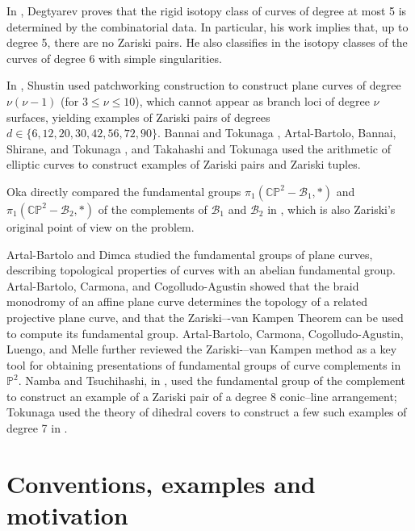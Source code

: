 \documentclass{svproc}
\begin{document}
In \cite{DEG_isotopy}, Degtyarev proves that the rigid isotopy class of curves of degree at most 5
is determined by the combinatorial data. In particular, his work implies that, up to
degree 5, there are no Zariski pairs. He also classifies in \cite{DEG} the isotopy classes of the
curves of degree 6 with simple singularities.

In \cite[Appendix A]{shustin_appendix}, Shustin used patchworking construction to construct plane curves of degree $ \nu (\nu-1) $ (for $ 3\le \nu \le 10 $), which cannot appear as branch loci of degree $ \nu $ surfaces, yielding examples of Zariski pairs of degrees $ d\in \{ 6, 12, 20, 30, 42, 56, 72, 90 \} $. 
Bannai and Tokunaga \cite{bannai_tokunaga2019zariski}, Artal-Bartolo, Bannai, Shirane, and Tokunaga \cite{bartolo_tokunaga2020torsion,bartolo_tokunaga2020torsion2}, and Takahashi and Tokunaga \cite{takahashi_tokunaga2020explicit} used the arithmetic of elliptic curves to construct examples of Zariski pairs and Zariski tuples. 

Oka directly compared the fundamental groups $ \pi_1(\mathbb{CP}^2 - \mathcal{B}_1, *)$ and $ \pi_1(\mathbb{CP}^2 - \mathcal{B}_2, *)$ of the complements of $\mathcal{B}_1$ and $\mathcal{B}_2$ in \cite{Oka1999FlexCA,Oka2002}, which is also Zariski's original point of view on the problem. 

Artal-Bartolo and Dimca \cite{Dimca} studied the fundamental groups of plane curves, describing topological properties of curves with an abelian fundamental group. Artal-Bartolo, Carmona, and Cogolludo-Agustin \cite{Artal2} showed that the braid monodromy of an affine plane curve determines the topology of a related projective plane curve, and that the Zariski–-van Kampen Theorem can be used to compute its fundamental group. Artal-Bartolo, Carmona, Cogolludo-Agustin, Luengo, and Melle \cite{Artal3} further reviewed the Zariski-–van Kampen method as a key tool for obtaining presentations of fundamental groups of curve complements in $\mathbb{P}^2$. Namba and Tsuchihashi, in \cite{Namba2004OnTF},  used the fundamental group of the complement to construct an example of a Zariski pair of a degree 8 conic--line arrangement; Tokunaga used the theory of dihedral covers to construct a  few such examples of degree 7 in \cite{tokunaga2014}. 

\section{Conventions, examples and motivation}
\end{document}
